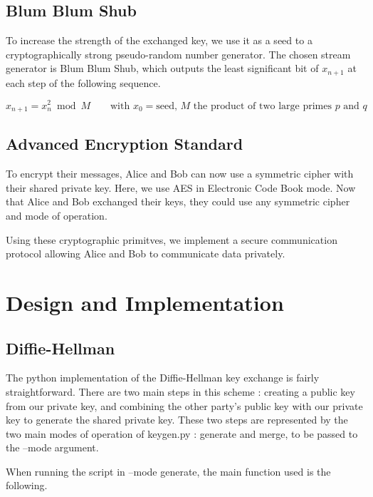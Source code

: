 \documentclass{article}
\begin{document}
\subsection{Blum Blum Shub}

To increase the strength of the exchanged key, we use it as a seed to a cryptographically strong pseudo-random number generator. The chosen stream generator is Blum Blum Shub\cite{Blum1986}, which outputs the least significant bit of $x_{{n+1}}$ at each step of the following sequence.

\begin{equation*}
    x_{n+1}=x_{n}^{2} \bmod M
    \quad \quad \text{with $x_{0} = \text{seed}$, $M$ the product of two large primes $p$ and $q$}
\end{equation*}

\subsection{Advanced Encryption Standard}

To encrypt their messages, Alice and Bob can now use a symmetric cipher with their shared private key. Here, we use AES in Electronic Code Book mode. Now that Alice and Bob exchanged their keys, they could use any symmetric cipher and mode of operation. 

Using these cryptographic primitves, we implement a secure communication protocol allowing Alice and Bob to communicate data privately.

\section{Design and Implementation}

\subsection{Diffie-Hellman}

The python implementation of the Diffie-Hellman key exchange is fairly straightforward. There are two main steps in this scheme : creating a public key from our private key, and combining the other party's public key with our private key to generate the shared private key. These two steps are represented by the two main modes of operation of keygen.py : generate and merge, to be passed to the --mode argument.

When running the script in --mode generate, the main function used is the following.
\end{document}
